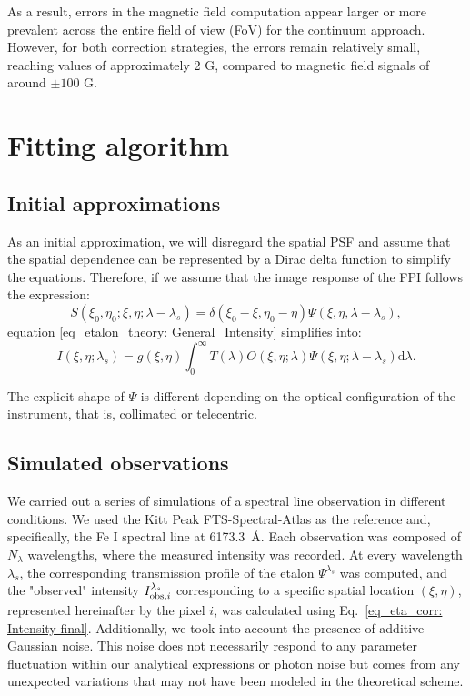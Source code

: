 As a result, errors in the magnetic field computation appear larger or more prevalent across the entire field of view (FoV) for the continuum approach. However, for both correction strategies, the errors remain relatively small, reaching values of approximately 2 G, compared to magnetic field signals of around $\pm 100$ G.  



\section{Fitting algorithm}
\subsection{\label{eta_corr_susec: etalon_transmission}Initial approximations}

As an initial approximation, we will disregard the spatial PSF and assume that the spatial dependence can be represented by a Dirac delta function to simplify the equations. Therefore, if we assume that the image response of the FPI follows the expression:
\begin{equation}
S\left(\xi_0, \eta_0; \xi , \eta; \lambda-\lambda_{s}\right)=\delta(\xi_0-\xi,\eta_0-\eta)\Psi(\xi,\eta,\lambda-\lambda_s),
\end{equation}
equation \eqref{eq_etalon_theory: General_Intensity} simplifies into:
\begin{equation}
    I\left(\xi, \eta ; \lambda_{s}\right)=g(\xi, \eta)\int_{0}^{\infty} T(\lambda)  O\left(\xi, \eta ; \lambda\right) \Psi\left(\xi, \eta ; \lambda-\lambda_{s}\right)  \mathrm{d} \lambda.
    \label{eq_eta_corr: intensity}
\end{equation}



The explicit shape of $\Psi$ is different depending on the optical configuration of the instrument, that is, collimated or telecentric.

\subsection{\label{eta_corr_susec: simulating obs} Simulated observations}
  
  
We carried out a series of simulations of a spectral line observation in different conditions. We used the Kitt Peak FTS-Spectral-Atlas as the reference \citep{fts} and, specifically, the Fe I spectral line at 6173.3~\r{A}. Each observation was composed of $N_\lambda$ wavelengths, where the measured intensity was recorded. At every wavelength $\lambda_s$, the corresponding transmission profile of the etalon $\Psi^{\lambda_s}$ was computed, and the "observed" intensity $I ^{\lambda _ s} _ {{\rm obs}, i}$ corresponding to a specific spatial location $(\xi, \eta)$, represented hereinafter by the pixel $i$, was calculated using Eq.~\eqref{eq_eta_corr: Intensity-final}. Additionally, we took into account the presence of additive Gaussian noise. This noise does not necessarily respond to any parameter fluctuation within our analytical expressions or photon noise but comes from any unexpected variations that may not have been modeled in the theoretical scheme.

